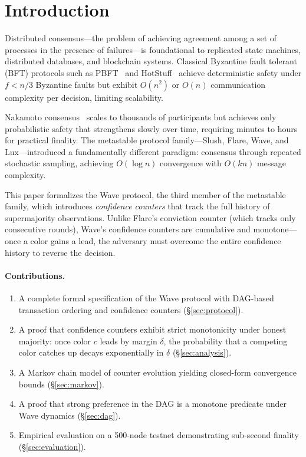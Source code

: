 \section{Introduction}

\label{sec:introduction}

Distributed consensus---the problem of achieving agreement among a set of processes in
the presence of failures---is foundational to replicated state machines, distributed
databases, and blockchain systems. Classical Byzantine fault tolerant (BFT) protocols
such as PBFT~\cite{castro1999practical} and HotStuff~\cite{yin2019hotstuff} achieve
deterministic safety under $f < n/3$ Byzantine faults but exhibit $O(n^2)$ or $O(n)$
communication complexity per decision, limiting scalability.

Nakamoto consensus~\cite{nakamoto2008bitcoin} scales to thousands of participants but
achieves only probabilistic safety that strengthens slowly over time, requiring minutes
to hours for practical finality. The metastable protocol family---Slush, Flare, Wave,
and Lux---introduced a fundamentally different paradigm: consensus through repeated
stochastic sampling, achieving $O(\log n)$ convergence with $O(kn)$ message complexity.

This paper formalizes the Wave protocol, the third member of the metastable family,
which introduces \emph{confidence counters} that track the full history of supermajority
observations. Unlike Flare's conviction counter (which tracks only consecutive rounds),
Wave's confidence counters are cumulative and monotone---once a color gains a lead,
the adversary must overcome the entire confidence history to reverse the decision.

\paragraph{Contributions.}
\begin{enumerate}[nosep]
\item A complete formal specification of the Wave protocol with DAG-based transaction
ordering and confidence counters (\S\ref{sec:protocol}).
\item A proof that confidence counters exhibit strict monotonicity under honest majority:
once color $c$ leads by margin $\delta$, the probability that a competing color catches
up decays exponentially in $\delta$ (\S\ref{sec:analysis}).
\item A Markov chain model of counter evolution yielding closed-form convergence bounds
(\S\ref{sec:markov}).
\item A proof that strong preference in the DAG is a monotone predicate under Wave
dynamics (\S\ref{sec:dag}).
\item Empirical evaluation on a 500-node testnet demonstrating sub-second finality
(\S\ref{sec:evaluation}).
\end{enumerate}

